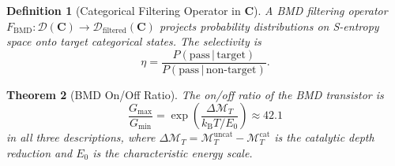\documentclass[twocolumn,10pt]{article}
\newtheorem{theorem}{Theorem}[section]
\newtheorem{definition}[theorem]{Definition}
\theoremstyle{remark}
\newcommand{\kB}{k_{\mathrm{B}}}
\newcommand{\Depth}{\mathcal{M}}
\newcommand{\CatC}{\mathbf{C}}
\newcommand{\BMD}{\mathrm{BMD}}
\begin{document}
\begin{definition}[Categorical Filtering Operator in $\CatC$]
\label{def:bmd_C}
A \emph{BMD filtering operator} $F_{\BMD}: \mathcal{D}(\CatC) \to \mathcal{D}_{\mathrm{filtered}}(\CatC)$ projects probability distributions on S-entropy space onto target categorical states.
The selectivity is
\begin{equation}
\eta = \frac{P(\mathrm{pass}\,|\,\mathrm{target})}{P(\mathrm{pass}\,|\,\mathrm{non\text{-}target})}.
\label{eq:selectivity}
\end{equation}
\end{definition}

\begin{theorem}[BMD On/Off Ratio]
\label{thm:bmd_ratio}
The on/off ratio of the BMD transistor is
\begin{equation}
\frac{G_{\max}}{G_{\min}} = \exp\!\left(\frac{\Delta\Depth_T}{\kB T / E_0}\right) \approx 42.1
\label{eq:onoff_ratio}
\end{equation}
in all three descriptions, where $\Delta\Depth_T = \Depth_T^{\mathrm{uncat}} - \Depth_T^{\mathrm{cat}}$ is the catalytic depth reduction and $E_0$ is the characteristic energy scale.
\end{theorem}
\end{document}
